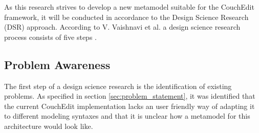 \documentclass[10pt,a4paper,oneside]{scrartcl}
\begin{document}







As this research strives to develop a new metamodel suitable for the CouchEdit framework, it will be conducted in accordance to the Design Science Research (DSR) approach. According to V. Vaishnavi et al. a design science research process consists of five steps \cite{Vaishnavi2004}.

\subsection{Problem Awareness}
The first step of a design science research is the identification of existing problems. As specified in section \ref{sec:problem_statement}, it was identified that the current CouchEdit implementation lacks an user friendly way of adapting it to different modeling syntaxes and that it is unclear how a metamodel for this architecture would look like.
\end{document}
